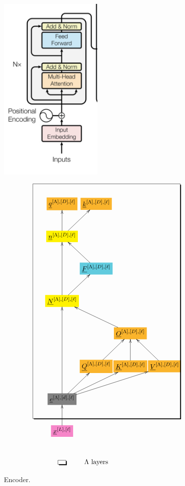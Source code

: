 \documentclass[12pt]{article}
\begin{document}
\begin{figure}[h!]\centering
\begin{minipage}{.4\linewidth}
\includegraphics[width=2in]{encoder.jpg}
\end{minipage}%
\begin{minipage}{.6\linewidth}
$$\xymatrix@R=2.5pc@C=0.1pc{
*+[F*:Dandelion]{\underline{q}^{[\Lambda],[D], [\ell]}}&*+[F*:Dandelion]{\underline{k}^{[\Lambda],[D], [\ell]}}&&
\\
*+[F*:yellow]{\underline{n}^{[\Lambda],[D], [\ell]}}\ar[ur]\ar[u]&&&
\\
&*+[F*:SkyBlue]{\underline{F}^{[\Lambda],[D], [\ell]}}\ar[ul]&&
\\
*+[F*:yellow]{\underline{N}^{[\Lambda],[D], [\ell]}}\ar[ur]\ar[uu]&&&
\\
&&*+[F*:Dandelion]{\underline{O}^{[\Lambda],[D], [\ell]}}\ar[ull]&
\\
&*+[F*:Dandelion]{\underline{Q}^{[\Lambda],[D], [\ell]}}\ar[ur]&*+[F*:Dandelion]{\underline{K}^{[\Lambda],[D], [\ell]}}\ar[u]&*+[F*:Dandelion]{\underline{V}^{[\Lambda],[D],[\ell]}}\ar[ul]
\\
*+[F*:gray]{\underline{e}^{[\Lambda],[d], [\ell]}}\ar[urr]\ar[uuu]\ar[ur]\ar[urrr]&&&
\\
*+[F*:Lavender]{\underline{x}^{[L],[\ell]}}\ar[u]&&&
\save
\POS"1,1"."7,1"."1,4"."7,4"!C*+<4.0em>\frm{-,}
\restore
\\
*+[F-,]{\;\;}&\text{$\Lambda$ layers}
}$$
\end{minipage}
\caption{Encoder.}
\label{fig-texnn-for-encoder}
\end{figure}
\end{document}
